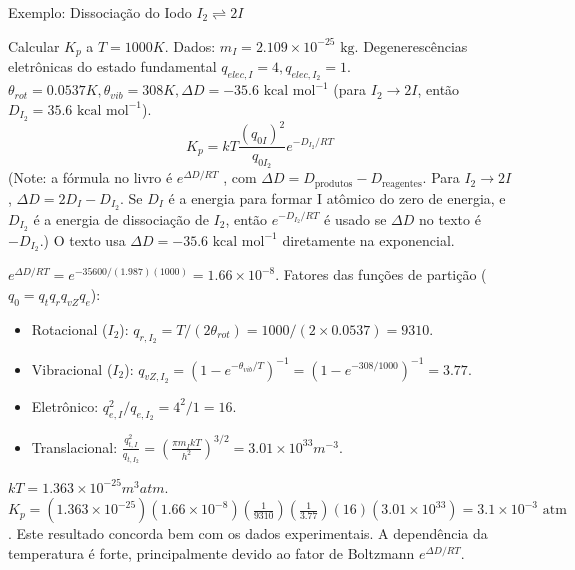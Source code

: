 \documentclass{beamer}
\begin{document}
\begin{frame}{Exemplo: Dissociação do Iodo $I_2 \rightleftharpoons 2I$}
    
    Calcular $K_p$ a $T=1000K$.
    Dados: $m_I = 2.109 \times 10^{-25} \text{ kg}$.  Degenerescências eletrônicas do estado fundamental $q_{elec,I}=4, q_{elec,I_2}=1$.  $\theta_{rot}=0.0537K, \theta_{vib}=308K, \Delta D = -35.6 \text{ kcal mol}^{-1}$ (para $I_2 \rightarrow 2I$, então $D_{I_2} = 35.6 \text{ kcal mol}^{-1}$). 
    $$ K_p = kT \frac{(q_{0I})^2}{q_{0I_2}} e^{-D_{I_2}/RT} $$
    (Note: a fórmula no livro é $e^{\Delta D/RT}$ , com $\Delta D = D_{\text{produtos}} - D_{\text{reagentes}}$. Para $I_2 \rightarrow 2I$, $\Delta D = 2D_I - D_{I_2}$. Se $D_I$ é a energia para formar I atômico do zero de energia, e $D_{I_2}$ é a energia de dissociação de $I_2$, então $e^{-D_{I_2}/RT}$ é usado se $\Delta D$ no texto é $-D_{I_2}$.) O texto usa $\Delta D = -35.6 \text{ kcal mol}^{-1}$ diretamente na exponencial. 

    $e^{\Delta D/RT} = e^{-35600/(1.987)(1000)} = 1.66 \times 10^{-8}$.  
    Fatores das funções de partição ($q_0 = q_t q_r q_{vZ} q_e$):
    \begin{itemize}
        \item Rotacional ($I_2$): $q_{r,I_2} = T/(2\theta_{rot}) = 1000/(2 \times 0.0537) = 9310$. 
        \item Vibracional ($I_2$): $q_{vZ,I_2} = (1-e^{-\theta_{vib}/T})^{-1} = (1-e^{-308/1000})^{-1} = 3.77$. 
        \item Eletrônico: $q_{e,I}^2/q_{e,I_2} = 4^2/1 = 16$. 
        \item Translacional: $\frac{q_{t,I}^2}{q_{t,I_2}} = \left(\frac{\pi m_I kT}{h^2}\right)^{3/2} = 3.01 \times 10^{33} m^{-3}$. 
    \end{itemize}
    
    $kT = 1.363 \times 10^{-25} m^3 atm$. 
    $K_p = (1.363 \times 10^{-25})(1.66 \times 10^{-8}) \left(\frac{1}{9310}\right) \left(\frac{1}{3.77}\right) (16) (3.01 \times 10^{33}) = 3.1 \times 10^{-3} \text{ atm}$. 
    Este resultado concorda bem com os dados experimentais.  A dependência da temperatura é forte, principalmente devido ao fator de Boltzmann $e^{\Delta D/RT}$. 
\end{frame}
\end{document}
